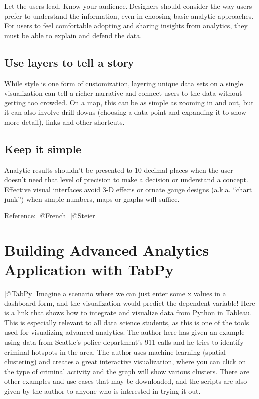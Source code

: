 \documentclass[]{book}
\theoremstyle{definition}
\theoremstyle{definition}
\theoremstyle{definition}
\theoremstyle{remark}
\begin{document}
Let the users lead. Know your audience. Designers should consider the
way users prefer to understand the information, even in choosing basic
analytic approaches. For users to feel comfortable adopting and sharing
insights from analytics, they must be able to explain and defend the
data.

\subsection{Use layers to tell a
story}\label{use-layers-to-tell-a-story}

While style is one form of customization, layering unique data sets on a
single visualization can tell a richer narrative and connect users to
the data without getting too crowded. On a map, this can be as simple as
zooming in and out, but it can also involve drill-downs (choosing a data
point and expanding it to show more detail), links and other shortcuts.

\subsection{Keep it simple}\label{keep-it-simple}

Analytic results shouldn't be presented to 10 decimal places when the
user doesn't need that level of precision to make a decision or
understand a concept. Effective visual interfaces avoid 3-D effects or
ornate gauge designs (a.k.a. ``chart junk'') when simple numbers, maps
or graphs will suffice.

Reference: {[}@French{]} {[}@Steier{]}

\section{Building Advanced Analytics Application with
TabPy}\label{building-advanced-analytics-application-with-tabpy}

{[}@TabPy{]} Imagine a scenario where we can just enter some x values in
a dashboard form, and the visualization would predict the dependent
variable! Here is a link that shows how to integrate and visualize data
from Python in Tableau. This is especially relevant to all data science
students, as this is one of the tools used for visualizing advanced
analytics. The author here has given an example using data from
Seattle's police department's 911 calls and he tries to identify
criminal hotspots in the area. The author uses machine learning (spatial
clustering) and creates a great interactive visualization, where you can
click on the type of criminal activity and the graph will show various
clusters. There are other examples and use cases that may be downloaded,
and the scripts are also given by the author to anyone who is interested
in trying it out.
\end{document}
